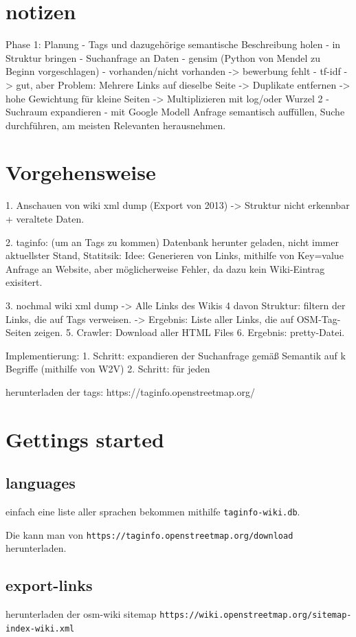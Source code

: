 \documentclass[12pt,pdftex,a4paper]{article}
\begin{document}
\section{notizen}
Phase 1: Planung
- Tags und dazugehörige semantische Beschreibung holen
- in Struktur bringen
- Suchanfrage an Daten 
- gensim (Python von Mendel zu Beginn vorgeschlagen)
- vorhanden/nicht vorhanden 
-> bewerbung fehlt
- tf-idf
-> gut, aber Problem: Mehrere Links auf dieselbe Seite
-> Duplikate entfernen
-> hohe Gewichtung für kleine Seiten
-> Multiplizieren mit log/oder Wurzel 2
- Suchraum expandieren
- mit Google Modell Anfrage semantisch auffüllen, Suche durchführen, am meisten Relevanten herausnehmen.


\pagebreak
\section{Vorgehensweise}

1. Anschauen von wiki xml dump (Export von 2013) 
-> Struktur nicht erkennbar + veraltete Daten.

2. taginfo: (um an Tags zu kommen) Datenbank herunter geladen, nicht immer aktuellster Stand, Statitsik: Idee: Generieren von Links, mithilfe von Key=value Anfrage an Website, aber möglicherweise Fehler, da dazu kein Wiki-Eintrag exisitert.

3. nochmal wiki xml dump -> Alle Links des Wikis
4  davon Struktur: filtern der Links, die auf Tags verweisen.
-> Ergebnis: Liste aller Links, die auf OSM-Tag-Seiten zeigen.
5. Crawler: Download aller HTML Files
6. Ergebnis: pretty-Datei.

Implementierung:
1. Schritt: expandieren der Suchanfrage gemäß Semantik auf k Begriffe (mithilfe von W2V) 
2. Schritt: für jeden 


herunterladen der tags: https://taginfo.openstreetmap.org/

\section{Gettings started}
\subsection{languages}
einfach eine liste aller sprachen bekommen mithilfe \texttt{taginfo-wiki.db}.

Die kann man von \texttt{https://taginfo.openstreetmap.org/download} herunterladen.

\subsection{export-links}
herunterladen der osm-wiki sitemap
\texttt{https://wiki.openstreetmap.org/sitemap-index-wiki.xml}
\end{document}
